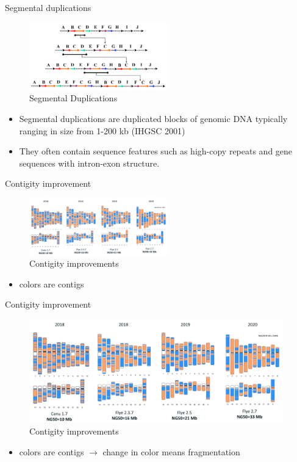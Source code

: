 \documentclass{beamer}
\begin{document}
  \begin{frame}{Segmental duplications}
    \begin{figure}
      \includegraphics[width=6cm]{images/SDs.png}
      \caption{Segmental Duplications}
      \label{fig:SD}
    \end{figure}
    \begin{itemize}
      \item Segmental duplications are duplicated blocks of genomic DNA typically ranging in size from 1-200 kb (IHGSC 2001)

      \item They often contain sequence features such as high-copy repeats and gene sequences with intron-exon structure. 
    \end{itemize}
  \end{frame}


  \begin{frame}{Contigity improvement}
    \begin{figure}
      \includegraphics[width=6cm]{images/contigity_improvement.png}
      \caption{Contigity improvements}
      \label{fig:contig_improvements}
    \end{figure}
    \begin{itemize}
      \item colors are contigs

    \end{itemize}
  \end{frame}

  \begin{frame}{Contigity improvement}
    \begin{figure}
      \includegraphics[width=11cm]{images/contigity_improvement.png}
      \caption{Contigity improvements}
      \label{fig:contig_improvements}
    \end{figure}
    \begin{itemize}
      \item colors are contigs $\rightarrow$ change in color means fragmentation
    \end{itemize}
  \end{frame}
\end{document}
